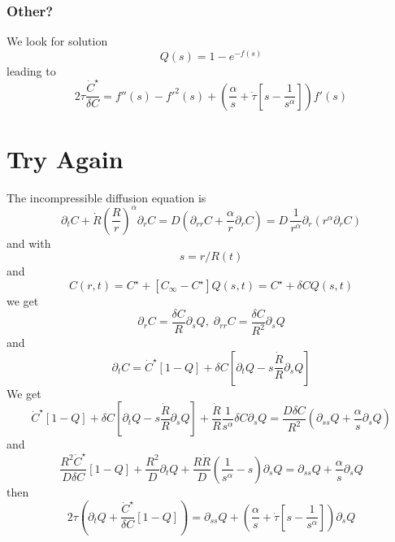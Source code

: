 \documentclass[11pt]{revtex4}
\begin{document}
\subsubsection{Other?}
We look for solution
\begin{equation}
	Q(s) = 1 - e^{-f(s)}
\end{equation}
leading to
\begin{equation}
	2\tau \dfrac{\dot{C}^\star}{\delta C} = f''(s) - f'^2(s) + \left( \dfrac{\alpha}{s} + \dot{\tau} \left[s-\dfrac{1}{s^\alpha}\right]\right) f'(s)
\end{equation}

\section{Try Again}

The incompressible diffusion equation is
\begin{equation}
	\partial_t C + \dot{R} \left(\dfrac{R}{r}\right)^\alpha  \partial_r C = D \left( \partial_{rr} C + \dfrac{\alpha}{r} \partial_r C \right) = D \, \dfrac{1}{r^\alpha} \partial_r \left(r^\alpha\partial_r C\right)
\end{equation}
and
with 
\begin{equation}
	s = r/R(t)
\end{equation}
and
\begin{equation}
	C(r,t) = C^\star + \left[C_\infty-C^\star\right] Q(s,t) = C^\star + \delta C Q(s,t)
\end{equation}
we get
\begin{equation}
	\partial_r C = \dfrac{\delta C}{R} \partial_s Q, \; \partial_{rr} C = \dfrac{\delta C}{R^2} \partial_s Q
\end{equation}
and
\begin{equation}
	\partial_t C = \dot{C}^\star \left[1-Q\right] + \delta C \left[\partial_t Q - s \dfrac{\dot{R}}{R} \partial_s Q \right]
\end{equation}
We get
\begin{equation}
	\dot{C}^\star \left[1-Q\right] + \delta C \left[\partial_t Q - s \dfrac{\dot{R}}{R} \partial_s Q \right] + \dfrac{\dot{R}}{R} \dfrac{1}{s^\alpha} \delta C \partial_s Q 
	= \dfrac{D \delta C}{R^2} \left( \partial_{ss} Q + \dfrac{\alpha}{s} \partial_s Q \right)
\end{equation}
and
\begin{equation}
  \dfrac{R^2\dot{C}^\star}{D\delta C}\left[1-Q\right] + \dfrac{R^2}{D} \partial_t Q + \dfrac{R\dot{R}}{D} \left(\dfrac{1}{s^\alpha}-s\right) \partial_s Q =   \partial_{ss} Q + \dfrac{\alpha}{s} \partial_s Q
\end{equation}
then
\begin{equation}
	2 \tau \left( \partial_t Q + \dfrac{\dot{C}^\star}{\delta C} \left[1-Q\right] \right) =
	 \partial_{ss} Q + \left( \dfrac{\alpha}{s} + \dot{\tau} \left[s - \dfrac{1}{s^\alpha} \right] \right) \partial_s Q
\end{equation}
\end{document}
